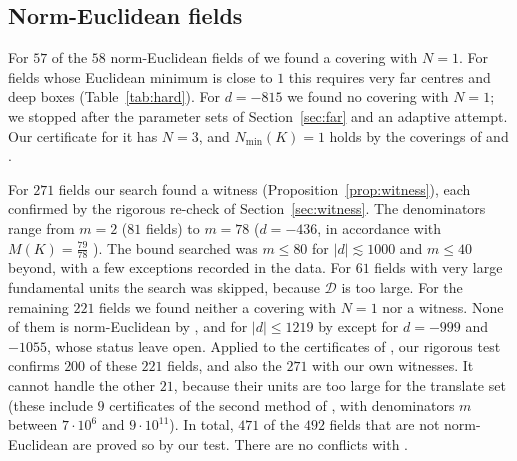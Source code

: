 \documentclass[11pt]{amsart}
\theoremstyle{definition}
\theoremstyle{remark}
\numberwithin{equation}{section}
\newcommand{\Nmin}{N_{\min}}
\begin{document}
\subsection{Norm-Euclidean fields}\label{sec:ne}
For $57$ of the $58$ norm-Euclidean fields of \cite{CL} we found a covering with $N=1$. For
fields whose Euclidean minimum is close to $1$ this requires very far centres and deep boxes
(Table~\ref{tab:hard}). For $d=-815$ we found no covering with $N=1$; we stopped after the
parameter sets of Section~\ref{sec:far} and an adaptive attempt. Our certificate for it has
$N=3$, and $\Nmin(K)=1$ holds by the coverings of \cite{CL} and \cite[\S6]{BBT}.

For $271$ fields our search found a witness (Proposition~\ref{prop:witness}), each confirmed by
the rigorous re-check of Section~\ref{sec:witness}. The denominators range from $m=2$ ($81$
fields) to $m=78$ ($d=-436$, in accordance with $M(K)=\frac{79}{78}$ \cite{CL}). The bound
searched was $m\le80$ for $|d|\lesssim1000$ and $m\le40$ beyond, with a few exceptions recorded
in the data. For $61$ fields with very large fundamental units the search was skipped, because
$\mathcal D$ is too large. For the remaining $221$ fields we found neither a covering with $N=1$
nor a witness. None of them is norm-Euclidean by \cite{BBT}, and for $|d|\le1219$ by \cite{CL}
except for $d=-999$ and $-1055$, whose status \cite{CL} leave open. Applied to the certificates
of \cite{BBT}, our rigorous test confirms $200$ of these $221$ fields, and also the $271$ with
our own witnesses. It cannot handle the other $21$, because their units are too large for the
translate set (these include $9$ certificates of the second method of \cite{BBT}, with
denominators $m$ between $7\cdot10^6$ and $9\cdot10^{11}$). In total, $471$ of the $492$ fields that are not norm-Euclidean are
proved so by our test. There are no conflicts with \cite{CL,BBT}.
\end{document}
